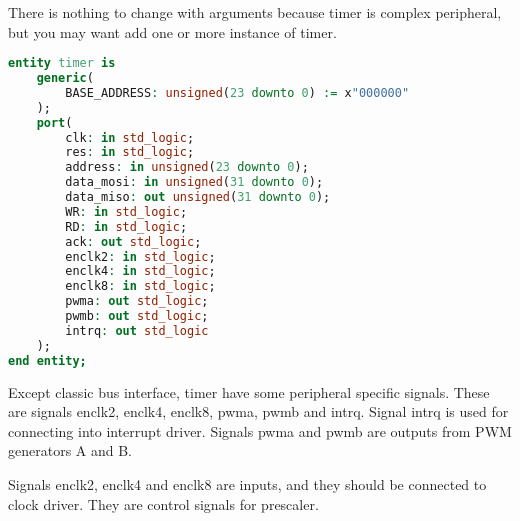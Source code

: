 There is nothing to change with arguments because timer is complex peripheral,
but you may want add one or more instance of timer.

\begin{lstlisting}[language=VHDL, frame=single]
entity timer is
    generic(
        BASE_ADDRESS: unsigned(23 downto 0) := x"000000"
    );
    port(
        clk: in std_logic;
        res: in std_logic;
        address: in unsigned(23 downto 0);
        data_mosi: in unsigned(31 downto 0);
        data_miso: out unsigned(31 downto 0);
        WR: in std_logic;
        RD: in std_logic;
        ack: out std_logic;
        enclk2: in std_logic;
        enclk4: in std_logic;
        enclk8: in std_logic;
        pwma: out std_logic;
        pwmb: out std_logic;
        intrq: out std_logic
    );
end entity;
\end{lstlisting}

Except classic bus interface, timer have some peripheral specific signals.
These are signals enclk2, enclk4, enclk8, pwma, pwmb and intrq. Signal intrq
is used for connecting into interrupt driver. Signals pwma and pwmb are outputs
from PWM generators A and B.

Signals enclk2, enclk4 and enclk8 are inputs, and they should be connected to
clock driver. They are control signals for prescaler.
